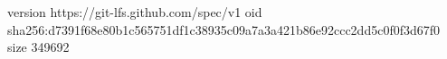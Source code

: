 version https://git-lfs.github.com/spec/v1
oid sha256:d7391f68e80b1c565751df1c38935c09a7a3a421b86e92ccc2dd5c0f0f3d67f0
size 349692

